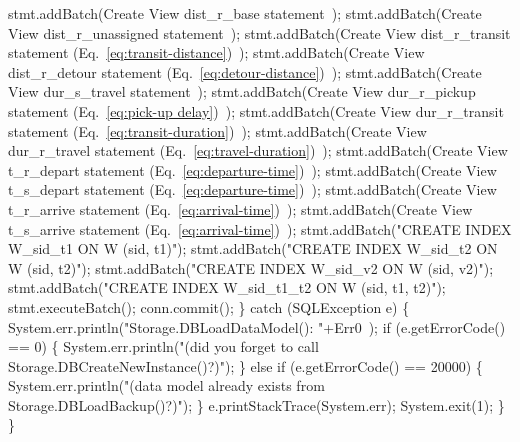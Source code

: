 \documentclass{article}
\def\nwendcode{\endtrivlist \endgroup}      %
\let\nwdocspar=\par
\theoremstyle{definition}                   %
\begin{document}
    stmt.addBatch(\LA{}Create View dist\_r\_base statement~{\nwtagstyle{}}\RA{});
    stmt.addBatch(\LA{}Create View dist\_r\_unassigned statement~{\nwtagstyle{}}\RA{});
    stmt.addBatch(\LA{}Create View dist\_r\_transit statement (Eq.~\ref{eq:transit-distance})~{\nwtagstyle{}}\RA{});
    stmt.addBatch(\LA{}Create View dist\_r\_detour statement (Eq.~\ref{eq:detour-distance})~{\nwtagstyle{}}\RA{});
    stmt.addBatch(\LA{}Create View dur\_s\_travel statement~{\nwtagstyle{}}\RA{});
    stmt.addBatch(\LA{}Create View dur\_r\_pickup statement (Eq.~\ref{eq:pick-up delay})~{\nwtagstyle{}}\RA{});
    stmt.addBatch(\LA{}Create View dur\_r\_transit statement (Eq.~\ref{eq:transit-duration})~{\nwtagstyle{}}\RA{});
    stmt.addBatch(\LA{}Create View dur\_r\_travel statement (Eq.~\ref{eq:travel-duration})~{\nwtagstyle{}}\RA{});
    stmt.addBatch(\LA{}Create View t\_r\_depart statement (Eq.~\ref{eq:departure-time})~{\nwtagstyle{}}\RA{});
    stmt.addBatch(\LA{}Create View t\_s\_depart statement (Eq.~\ref{eq:departure-time})~{\nwtagstyle{}}\RA{});
    stmt.addBatch(\LA{}Create View t\_r\_arrive statement (Eq.~\ref{eq:arrival-time})~{\nwtagstyle{}}\RA{});
    stmt.addBatch(\LA{}Create View t\_s\_arrive statement (Eq.~\ref{eq:arrival-time})~{\nwtagstyle{}}\RA{});
    stmt.addBatch("CREATE INDEX W_sid_t1 ON W (sid, t1)");
    stmt.addBatch("CREATE INDEX W_sid_t2 ON W (sid, t2)");
    stmt.addBatch("CREATE INDEX W_sid_v2 ON W (sid, v2)");
    stmt.addBatch("CREATE INDEX W_sid_t1_t2 ON W (sid, t1, t2)");
    stmt.executeBatch();
    conn.commit();
  \} catch (SQLException e) \{
    System.err.println("Storage.DBLoadDataModel(): "+\LA{}Err0~{\nwtagstyle{}}\RA{});
    if (e.getErrorCode() == 0) \{
      System.err.println("(did you forget to call Storage.DBCreateNewInstance()?)");
    \} else if (e.getErrorCode() == 20000) \{
      System.err.println("(data model already exists from Storage.DBLoadBackup()?)");
    \}
    e.printStackTrace(System.err);
    System.exit(1);
  \}
\}
\eatline
{}\nwendcode{}\nwdocspar
\end{document}
